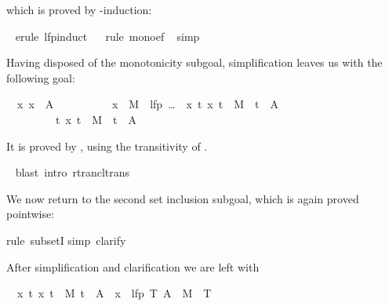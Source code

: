 \begin{isabellebody}
\begin{isamarkuptxt}
\begin{isabelle}
\end{isabelle}
which is proved by -induction:%
\end{isamarkuptxt}%
\isamarkuptrue%
\ \isamarkupfalse%
{\isacharparenleft}erule\ lfp{\isacharunderscore}induct{\isacharparenright}\isanewline
\ \ \isamarkupfalse%
{\isacharparenleft}rule\ mono{\isacharunderscore}ef{\isacharparenright}\isanewline
\ \isamarkupfalse%
{\isacharparenleft}simp{\isacharparenright}%
\begin{isamarkuptxt}%
\noindent
Having disposed of the monotonicity subgoal,
simplification leaves us with the following goal:
\begin{isabelle}
\ {}{\isachardot}\ {\isasymAnd}x{\isachardot}\ x\ {\isasymin}\ A\ {\isasymor}\isanewline
\ \ \ \ \ \ \ \ \ x\ {\isasymin}\ M{\isasyminverse}\ {\isacharbackquote}{\isacharbackquote}\ {\isacharparenleft}lfp\ {\isacharparenleft}\dots{\isacharparenright}\ {\isasyminter}\ {\isacharbraceleft}x{\isachardot}\ {\isasymexists}t{\isachardot}\ {\isacharparenleft}x{\isacharcomma}\ t{\isacharparenright}\ {\isasymin}\ M\isactrlsup {\isacharasterisk}\ {\isasymand}\ t\ {\isasymin}\ A{\isacharbraceright}{\isacharparenright}\isanewline
\ \ \ \ \ \ \ \ {\isasymLongrightarrow}\ {\isasymexists}t{\isachardot}\ {\isacharparenleft}x{\isacharcomma}\ t{\isacharparenright}\ {\isasymin}\ M\isactrlsup {\isacharasterisk}\ {\isasymand}\ t\ {\isasymin}\ A
\end{isabelle}
It is proved by , using the transitivity of 
.%
\end{isamarkuptxt}%
\isamarkuptrue%
\ \isamarkupfalse%
{\isacharparenleft}blast\ intro{\isacharcolon}\ rtrancl{\isacharunderscore}trans{\isacharparenright}%
\begin{isamarkuptxt}%
We now return to the second set inclusion subgoal, which is again proved
pointwise:%
\end{isamarkuptxt}%
\isamarkuptrue%
\isamarkupfalse%
{\isacharparenleft}rule\ subsetI{\isacharparenright}\isanewline
{}\isamarkupfalse%
{\isacharparenleft}simp{\isacharcomma}\ clarify{\isacharparenright}%
\begin{isamarkuptxt}%
\noindent
After simplification and clarification we are left with
\begin{isabelle}%
\ {}{\isachardot}\ {\isasymAnd}x\ t{\isachardot}\ {\isasymlbrakk}{\isacharparenleft}x{\isacharcomma}\ t{\isacharparenright}\ {\isasymin}\ M\isactrlsup {\isacharasterisk}{\isacharsemicolon}\ t\ {\isasymin}\ A{\isasymrbrakk}\ {\isasymLongrightarrow}\ x\ {\isasymin}\ lfp\ {\isacharparenleft}{\isasymlambda}T{\isachardot}\ A\ {\isasymunion}\ M{\isasyminverse}\ {\isacharbackquote}{\isacharbackquote}\ T{\isacharparenright}%

\end{isabelle}
\end{isamarkuptxt}
\end{isabellebody}
